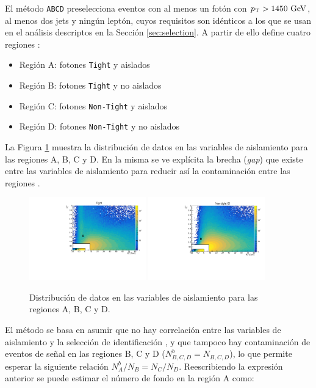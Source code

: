 El método \texttt{ABCD} preselecciona eventos con al menos un fotón con $p_{\text{T}}>1450\ \text{GeV}$, al menos dos jets y ningún leptón, cuyos requisitos son idénticos a los que se usan en el análisis descriptos en la Sección \ref{sec:selection}. A partir de ello define cuatro regiones \cite{ATL-COM-PHYS-2016-1626}:

\begin{itemize}
  \item Región A: fotones \texttt{Tight} y aislados
  \item Región B: fotones \texttt{Tight} y no aislados
  \item Región C: fotones \texttt{Non-Tight} y aislados
  \item Región D: fotones \texttt{Non-Tight} y no aislados
\end{itemize}

La Figura \ref{fig:abcd_regions} muestra la distribución de datos en las variables de aislamiento para las regiones A, B, C y D. En la misma se ve explícita la brecha (\textit{gap}) que existe entre las variables de aislamiento para reducir así la contaminación entre las regiones .

\begin{figure}
  \centering
  \includegraphics[width=0.45\textwidth]{images/analysis/tight_ABCD_data.pdf}
  \includegraphics[width=0.45\textwidth]{images/analysis/nontight_ABCD_data.pdf}
  \caption{Distribución de datos en las variables de aislamiento para las regiones A, B, C y D.}
  \label{fig:abcd_regions}
\end{figure}


El método se basa en asumir que no hay correlación entre las variables de aislamiento y la selección de identificación \cite{tesis_tony}, y que tampoco hay contaminación de eventos de señal en las regiones B, C y D ($N_{B,C,D}^b=N_{B,C,D}$), lo que permite esperar la siguiente relación $N_A^b/N_B=N_C/N_D$. 
Reescribiendo la expresión anterior se puede estimar el número de fondo en la región A como:


